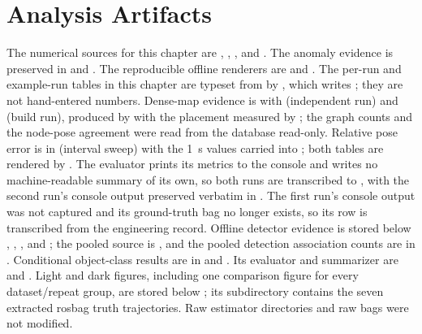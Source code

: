 \section*{Analysis Artifacts}

The numerical sources for this chapter are
,
, , and
. The anomaly evidence is preserved in
 and . The reproducible
offline renderers are  and
. The per-run and example-run tables
in this chapter are typeset from  by
, which writes
; they are not hand-entered numbers.
Dense-map evidence is  with
 (independent run) and
 (build run), produced by
 with the placement measured by
; the graph counts and the node-pose agreement were
read from the database read-only. Relative pose error is in
 (interval sweep) with the \SI{1}{\second} values carried
into ; both tables are rendered by
. The evaluator prints its metrics to the console
and writes no machine-readable summary of its own, so both runs are transcribed to
, with the second run's console
output preserved verbatim in . The first run's
console output was not captured and its ground-truth bag no longer exists, so its
row is transcribed from the engineering record. Offline detector evidence is stored
below , ,
, and ; the pooled source is
, and the pooled detection association counts are in
. Conditional object-class results are in
 and
. Its evaluator and summarizer are
 and . Light and
dark figures, including one
comparison figure for every dataset/repeat group, are stored below
; its  subdirectory
contains the seven extracted rosbag truth trajectories. Raw estimator directories
and raw bags were not modified.
